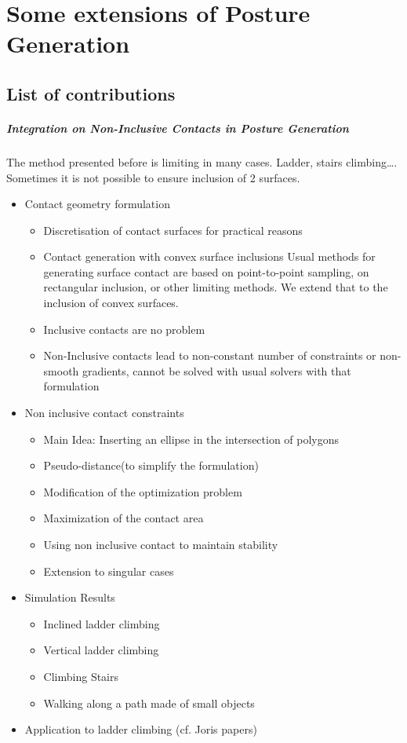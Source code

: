 \chapter{
Some extensions of Posture Generation
}
\section{List of contributions}
\paragraph{Integration on Non-Inclusive Contacts in Posture Generation}

The method presented before is limiting in many cases. Ladder, stairs climbing\dots.
Sometimes it is not possible to ensure inclusion of 2 surfaces.

\begin{itemize}
  \item Contact geometry formulation
    \begin{itemize}
      \item Discretisation of contact surfaces for practical reasons
      \item Contact generation with convex surface inclusions
Usual methods for generating surface contact are based on point-to-point sampling, on rectangular inclusion, or other limiting methods. We extend that to the inclusion of convex surfaces.
      \item Inclusive contacts are no problem
      \item Non-Inclusive contacts lead to non-constant number of constraints or non-smooth gradients, cannot be solved with usual solvers with that formulation
    \end{itemize}
  \item{Non inclusive contact constraints}
    \begin{itemize}
      \item {Main Idea: Inserting an ellipse in the intersection of polygons}
      \item {Pseudo-distance(to simplify the formulation)}
      \item {Modification of the optimization problem}
      \item {Maximization of the contact area}
      \item {Using non inclusive contact to maintain stability}
      \item {Extension to singular cases}
    \end{itemize}
  \item{Simulation Results}
    \begin{itemize}
      \item{Inclined ladder climbing}
      \item{Vertical ladder climbing}
      \item{Climbing Stairs}
      \item{Walking along a path made of small objects}
    \end{itemize}
  \item{Application to ladder climbing (cf. Joris papers)}
\end{itemize}

